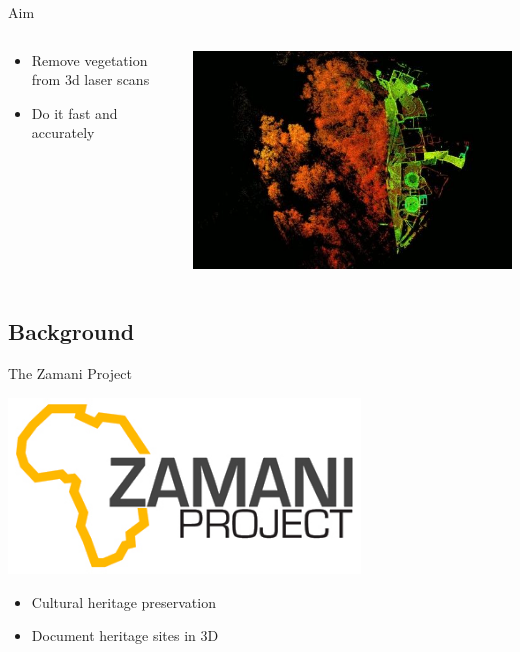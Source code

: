 \documentclass{beamer}
\begin{document}
\begin{frame}{Aim}


\begin{columns}[T]
\begin{column}{0.5\textwidth}

\begin{itemize}
\item  Remove vegetation from 3d laser scans
\item  Do it fast and accurately
\end{itemize}

\end{column}
\begin{column}{0.5\textwidth}

\includegraphics[width=1\textwidth]{pics/trees}

\end{column}
\end{columns}


\end{frame}

\subsection{Background}

\begin{frame}{The Zamani Project}

  \includegraphics[width=0.70\textwidth]{pics/Zamani_logo}

  \begin{itemize}
  \item Cultural heritage preservation
  \item Document heritage sites in 3D 
  \end{itemize}
\end{frame}
\end{document}
